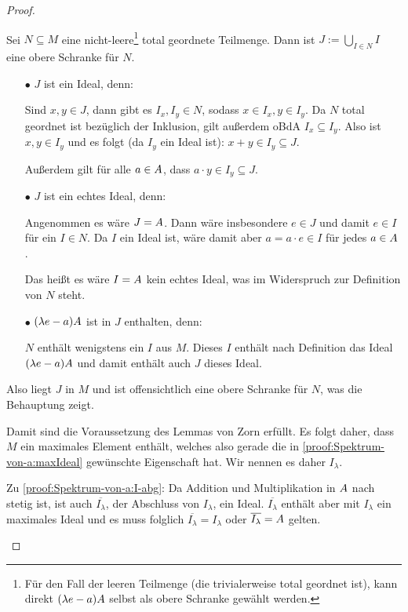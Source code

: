 \begin{proof}
\begin{itemize}
\Beh Sei $N \subseteq M$ eine nicht-leere\footnote{Für den Fall der leeren Teilmenge (die trivialerweise total geordnet ist), kann direkt $(\lambda e-a)A$ selbst als obere Schranke gewählt werden.} total geordnete Teilmenge. Dann ist $J := \bigcup_{I \in N} I$ eine obere Schranke für $N$.
\begin{itemize}
	\item[$\bullet$] $J$ ist ein Ideal, denn:
	
	Sind $x,y \in J$, dann gibt es $I_x, I_y \in N$, sodass $x \in I_x, y \in I_y$. Da $N$ total geordnet ist bezüglich der Inklusion, gilt außerdem oBdA $I_x \subseteq I_y$. Also ist $x,y \in I_y$ und es folgt (da $I_y$ ein Ideal ist): $x+y \in I_y \subseteq J$.
	
	Außerdem gilt für alle $a \in A$, dass $a\cdot y \in I_y \subseteq J$.
	
	\item[$\bullet$] $J$ ist ein echtes Ideal, denn:
	
	Angenommen es wäre $J = A$. Dann wäre insbesondere $e \in J$ und damit $e \in I$ für ein $I \in N$. Da $I$ ein Ideal ist, wäre damit aber $a = a\cdot e \in I$ für jedes $a \in A$.
	
	Das heißt es wäre $I = A$ kein echtes Ideal, was im Widerspruch zur Definition von $N$ steht.
	
	\item[$\bullet$] $(\lambda e-a)A$ ist in $J$ enthalten, denn:
	
	$N$ enthält wenigstens ein $I$ aus $M$. Dieses $I$ enthält nach Definition das Ideal $(\lambda e-a)A$ und damit enthält auch $J$ dieses Ideal.
\end{itemize}
Also liegt $J$ in $M$ und ist offensichtlich eine obere Schranke für $N$, was die Behauptung zeigt.

Damit sind die Voraussetzung des Lemmas von Zorn erfüllt. Es folgt daher, dass $M$ ein maximales Element enthält, welches also gerade die in \ref{proof:Spektrum-von-a:maxIdeal} gewünschte Eigenschaft hat. Wir nennen es daher $I_\lambda$.

Zu \ref{proof:Spektrum-von-a:I-abg}:
Da Addition und Multiplikation in $A$ nach  stetig ist, ist auch $\overline{I_\lambda}$, der Abschluss von $I_\lambda$, ein Ideal. $\overline{I_\lambda}$ enthält aber mit $I_\lambda$ ein maximales Ideal und es                        muss folglich $\overline{I_\lambda} = I_\lambda$ oder $\overline{I_\lambda} = A$ gelten.


\end{itemize}
\end{proof}
